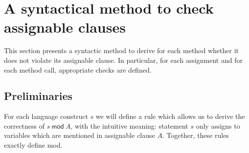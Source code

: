 \documentclass[a4paper]{llncs}
\newcommand{\java}{\textsc{Java}}
\newcommand{\MOD}[2]{\ensuremath{\mathit{#1}\:\mathsf{mod}\:\ensuremath{\mathit{#2}}}}
\begin{document}














\section{A syntactical method to check assignable clauses}
\label{sec-syn-met-che-ass-cla}

This section presents a syntactic method to derive for each method
whether it does not violate its assignable clause. In particular, for
each assignment and for each method call, appropriate checks are defined.


\subsection{Preliminaries}
For each language construct \(s\) we will define a rule which allows
us to derive the correctness of \MOD{s}{A}, with the intuitive
meaning: statement \(s\) only assigns to variables which are mentioned
in assignable clause \(A\). Together, these rules exactly define
\textsf{mod}.
\end{document}
